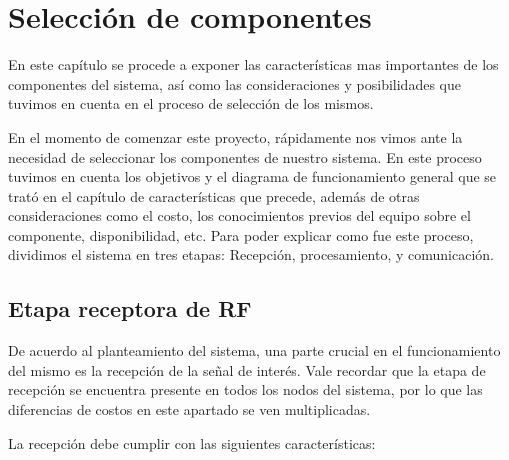 \chapter{Selección de componentes}
En este capítulo se procede a exponer las características mas importantes  de los componentes del sistema, así como las consideraciones y 
posibilidades que tuvimos en cuenta en el proceso de selección de los mismos. \par

En el momento de comenzar este proyecto, rápidamente nos vimos ante la necesidad de seleccionar los componentes de nuestro sistema. 
En este proceso tuvimos en cuenta los objetivos y el diagrama de funcionamiento general que se trató en el capítulo de características que precede,
además de otras consideraciones como el costo, los conocimientos previos del equipo sobre el componente, disponibilidad, etc. 
Para poder explicar como fue este proceso, dividimos el sistema en tres etapas: Recepción, procesamiento, y comunicación.

\section{Etapa receptora de RF} \par
De acuerdo al planteamiento del sistema, una parte crucial en el funcionamiento del mismo es la recepción de la señal de interés.
Vale recordar que la etapa de recepción se encuentra presente en todos los nodos del sistema, por lo que las diferencias de costos
en este apartado se ven multiplicadas.\par
La recepción debe cumplir con las siguientes características:

